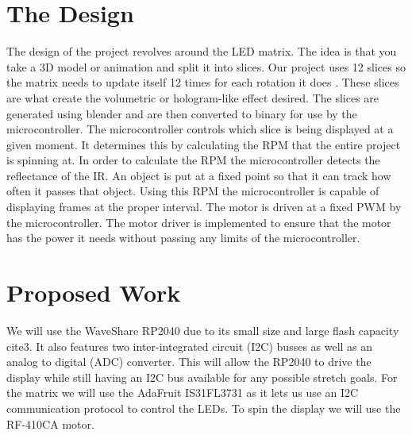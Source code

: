\documentclass[11pt,journal]{IEEEtran}
\begin{document}
\section{The Design}
The design of the project revolves around the LED matrix. The idea is that you take a 3D model or animation and split it into slices. Our project uses 12 slices so the matrix needs to update itself 12 times for each rotation it does \cite{Sun2014AnID}. These slices are what create the volumetric or hologram-like effect desired. The slices are generated using blender and are then converted to binary for use by the microcontroller. The microcontroller controls which slice is being displayed at a given moment. It determines this by calculating the RPM that the entire project is spinning at. In order to calculate the RPM the microcontroller detects the reflectance of the IR. An object is put at a fixed point so that it can track how often it passes that object. Using this RPM the microcontroller is capable of displaying frames at the proper interval. The motor is driven at a fixed PWM by the microcontroller. The motor driver is implemented to ensure that the motor has the power it needs without passing any limits of the microcontroller.


\section{Proposed Work}

We will use the WaveShare RP2040 due to its small size and large flash capacity cite{3}. It also features two inter-integrated circuit (I2C) busses as well as an analog to digital (ADC) converter. This will allow the RP2040 to drive the display while still having an I2C bus available for any possible stretch goals. For the matrix we will use the AdaFruit IS31FL3731 as it lets us use an I2C communication protocol to control the LEDs. To spin the display we will use the RF-410CA motor. 
\end{document}
